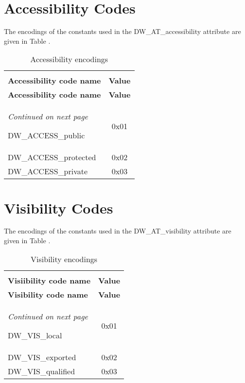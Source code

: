 \section{Accessibility Codes}
\label{datarep:accessibilitycodes}
The encodings of the constants used in the DW\-\_AT\-\_accessibility
attribute are given in 
Table .

\begin{centering}
\setlength{\extrarowheight}{0.1cm}
\begin{longtable}{l|c}
  \caption{Accessibility encodings} \label{tab:accessibilityencodings}\\
  \hline \\ \bfseries Accessibility code name&\bfseries Value \\ \hline
\endfirsthead
  \bfseries Accessibility code name&\bfseries Value\\ \hline
\endhead
  \hline \emph{Continued on next page}
\endfoot
  \hline
\endlastfoot

DW\-\_ACCESS\-\_public&0x01  \\
DW\-\_ACCESS\-\_protected&0x02 \\
DW\-\_ACCESS\-\_private&0x03 \\

\end{longtable}
\end{centering}


\section{Visibility Codes}
\label{datarep:visibilitycodes}
The encodings of the constants used in the 
DW\-\_AT\-\_visibility attribute are given in 
Table . 

\begin{centering}
\setlength{\extrarowheight}{0.1cm}
\begin{longtable}{l|c}
  \caption{Visibility encodings} \label{tab:visibilityencodings}\\
  \hline \\ \bfseries Visiibility code name&\bfseries Value \\ \hline
\endfirsthead
  \bfseries Visibility code name&\bfseries Value\\ \hline
\endhead
  \hline \emph{Continued on next page}
\endfoot
  \hline
\endlastfoot

DW\-\_VIS\-\_local&0x01 \\
DW\-\_VIS\-\_exported&0x02 \\
DW\-\_VIS\-\_qualified&0x03 \\

\end{longtable}
\end{centering}

